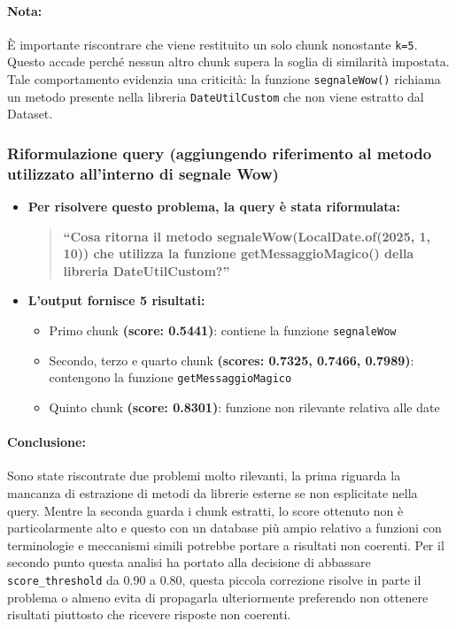 \documentclass[12pt,a4paper,openright,twoside]{book}
\begin{document}
    \paragraph{Nota:}
    È importante riscontrare che viene restituito un solo chunk nonostante \texttt{k=5}.
    Questo accade perché nessun altro chunk supera la soglia di similarità impostata.
    Tale comportamento evidenzia una criticità: la funzione \texttt{segnaleWow()} richiama un metodo presente nella libreria \texttt{DateUtilCustom} che non viene estratto dal Dataset.

    \subsubsection{Riformulazione query (aggiungendo riferimento al metodo utilizzato all'interno di segnale Wow)}
        \begin{itemize}
            \item \textbf{Per risolvere questo problema, la query è stata riformulata:}
            \begin{quote}
                \textbf{``Cosa ritorna il metodo segnaleWow(LocalDate.of(2025, 1, 10)) che utilizza la funzione getMessaggioMagico() della libreria DateUtilCustom?''}
            \end{quote}
            \item \textbf{L'output fornisce 5 risultati:}
            \begin{itemize}
                \item Primo chunk \textbf{(score: 0.5441)}: contiene la funzione \texttt{segnaleWow}
                \item Secondo, terzo e quarto chunk \textbf{(scores: 0.7325, 0.7466, 0.7989)}: contengono la funzione \texttt{getMessaggioMagico}
                \item Quinto chunk \textbf{(score: 0.8301)}: funzione non rilevante relativa alle date
            \end{itemize}
        \end{itemize}

    \paragraph{Conclusione:}
    Sono state riscontrate due problemi molto rilevanti, la prima riguarda la mancanza di estrazione di metodi da librerie esterne se non esplicitate nella query.
    Mentre la seconda guarda i chunk estratti, lo score ottenuto non è particolarmente alto e questo con un database più ampio relativo a funzioni con terminologie e meccanismi simili potrebbe portare a risultati non coerenti.
    Per il secondo punto questa analisi ha portato alla decisione di abbassare \texttt{score\_threshold} da 0.90 a 0.80,
    questa piccola correzione risolve in parte il problema o almeno evita di propagarla ulteriormente preferendo non ottenere risultati piuttosto che ricevere risposte non coerenti.
    
\end{document}
